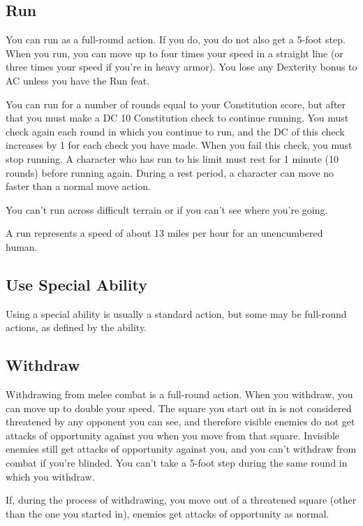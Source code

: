 \subsection{Run}

				
You can run as a full-round action. If you do, you do not also get a 5-foot step. When you run, you can move up to four times your speed in a straight line (or three times your speed if you're in heavy armor). You lose any Dexterity bonus to AC unless you have the Run feat. 
				
You can run for a number of rounds equal to your Constitution score, but after that you must make a DC 10 Constitution check to continue running. You must check again each round in which you continue to run, and the DC of this check increases by 1 for each check you have made. When you fail this check, you must stop running. A character who has run to his limit must rest for 1 minute (10 rounds) before running again. During a rest period, a character can move no faster than a normal move action.
				
You can't run across difficult terrain or if you can't see where you're going.
				
A run represents a speed of about 13 miles per hour for an unencumbered human.
				
\subsection{Use Special Ability}

				
Using a special ability is usually a standard action, but some may be full-round actions, as defined by the ability.
				
\subsection{Withdraw}

				
Withdrawing from melee combat is a full-round action. When you withdraw, you can move up to double your speed. The square you start out in is not considered threatened by any opponent you can see, and therefore visible enemies do not get attacks of opportunity against you when you move from that square. Invisible enemies still get attacks of opportunity against you, and you can't withdraw from combat if you're blinded. You can't take a 5-foot step during the same round in which you withdraw.
				
If, during the process of withdrawing, you move out of a threatened square (other than the one you started in), enemies get attacks of opportunity as normal.
				
